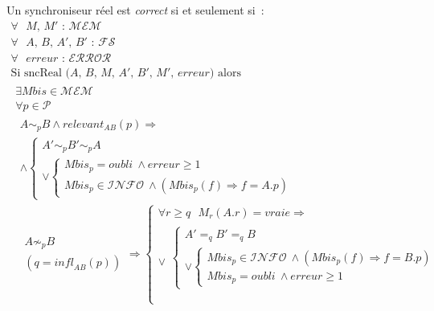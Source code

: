 \documentclass[11pt]{report}
\newcommand{\fs}{\ensuremath{\mathcal{FS}}}
\newcommand{\error}{\ensuremath{\mathcal{ERROR}}}
\newcommand{\mem}{\ensuremath{\mathcal{MEM}}}
\newcommand{\path}{\ensuremath{\mathcal{P}}}
\newcommand{\amnes}{\ensuremath{\mathit{oubli}}}
\newcommand{\ensemb}{\ensuremath{\mathcal{INFO}}}
\begin{document}
{Un synchroniseur r\'eel est \emph{correct} si et seulement si~:
\[
\begin{array}{l}
\forall \mbox{\ $M$, $M'$~: \ } \mem\ \\
\forall \mbox{\ $A$, $B$, $A'$, $B'$~: \ } \fs\ \\
\forall \mbox{\ $\mathit{erreur}$~: \ } \error\ \\
\mbox{Si sncReal ($A$, $B$, $M$, $A'$, $B'$, $M'$, $\mathit{erreur}$) alors}\\
  \begin{array}{l} 
   \exists \mathit{Mbis} \in \mem\ \\
   \forall p \in \path\ \\
\begin{array}{l} 
 A \sim_{p} B \wedge \mathit{relevant}_{AB}(p) \Rightarrow\\ 
 \wedge 
 \left\{
  \begin{array}{l}
   A' \sim_{p} B' \sim_{p} A\\
   \vee 
    \left\{ 
     \begin{array}{l}
      \mathit{Mbis}_{p} = \amnes\ \wedge \mathit{erreur} \geq 1 \\
      \mathit{Mbis}_{p} \in \ensemb\ 
       \wedge (\mathit{Mbis}_{p}(f) \Rightarrow f = A.p)
     \end{array}
    \right.
   \end{array} 
  \right.\\
 \begin{array}{l}
  A \not\sim_{p} B\\
  (q = \mathit{infl}_{AB}(p))
  \end{array} \Rightarrow 
   \left\{ 
    \begin{array}{l} 
     \forall r \geq q \mbox{\ } M_{r}(A.r) = vraie \Rightarrow \\
\vee
       \begin{array}{l} 
        \left\{ \begin{array}{l}
         A' =_{q} B' =_{q} B\\
        \vee 
         \left\{ 
          \begin{array}{l} 
           \mathit{Mbis}_{p} \in \ensemb\ \wedge (\mathit{Mbis}_{p}(f) \Rightarrow f = B.p)\\
           \mathit{Mbis}_{p} = \amnes\ \wedge \mathit{erreur} \geq 1
          \end{array}
         \right. \end{array} \right. \\\\

\end{array}
\end{array}
\end{array}
\end{array}
\end{array}\]}
\end{document}
